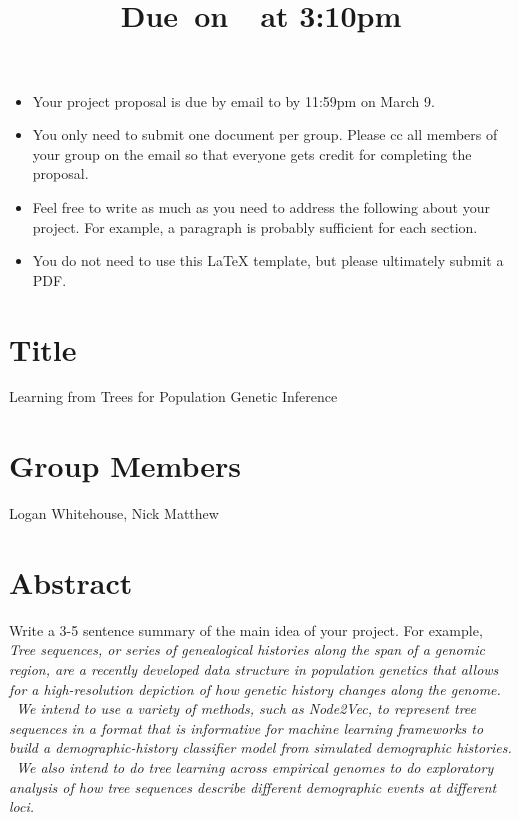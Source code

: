 \documentclass{article}
\title{
    \vspace{2in}
    \textmd{\textbf{\hmwkClass\hmwkTitle}}\\
    \normalsize\vspace{0.1in}\small{Due\ on\ \hmwkDueDate\ at 3:10pm}\\
    \vspace{3in}
}
\author{\hmwkAuthorName}
\date{}
\begin{document}

\begin{itemize}
\item Your project proposal is due by email to  by 11:59pm on March 9. 
\item You only need to submit one document per group. Please cc all members of your group on the email so that everyone gets credit for completing the proposal.  
\item Feel free to write as much as you need to address the following about your project. For example, a paragraph is probably sufficient for each section. 
\item You do not need to use this LaTeX template, but please ultimately submit a PDF. 
\end{itemize}

\section{Title}

Learning from Trees for Population Genetic Inference

\section{Group Members}

Logan Whitehouse, Nick Matthew

\section{Abstract}

Write a 3-5 sentence summary of the main idea of your project. For example, \\

\emph{Tree sequences, or series of genealogical histories along the span of a genomic region, are a recently developed data structure in population genetics that allows for a high-resolution depiction of how genetic history changes along the genome. \
We intend to use a variety of methods, such as Node2Vec, to represent tree sequences in a format that is informative for machine learning frameworks to build a demographic-history classifier model from simulated demographic histories. \
We also intend to do tree learning across empirical genomes to do exploratory analysis of how tree sequences describe different demographic events at different loci.}
\end{document}
